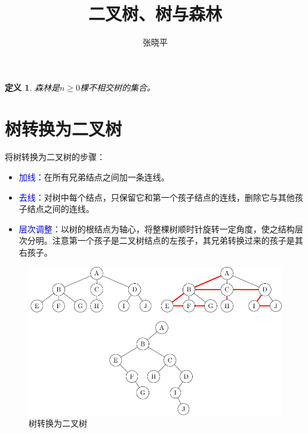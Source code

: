 \documentclass[10pt]{article}
\newcommand{\blue}{\textcolor{blue}}
\begin{document}
\renewcommand{\proofname}{\textbf{证明}}
\newtheorem{li}{例}
\newtheorem{jielun}{结论}
\newtheorem{dingli}{定理}
\newtheorem{mingti}{{命题}} 
\newtheorem{yinli}{{引理}} 
\newtheorem{tuilun}{{推论}}
\newtheorem{dingyi}{{定义}} 
\newtheorem*{jie}{{解}}
\newtheorem*{zhengming}{{证明}}
\newtheorem{zhu}{{注}}
\newtheorem*{zhu*}{{注}}
\newtheorem{xingzhi}{{性质}}
\newtheorem{wenti}{{问题}}

\title{二叉树、树与森林}
\author{张晓平}
\maketitle

\begin{dingyi}
森林是$n\ge0$棵不相交树的集合。
\end{dingyi}
\section{树转换为二叉树}
将树转换为二叉树的步骤：
\begin{itemize}
\item[1.]  \blue{加线：}在所有兄弟结点之间加一条连线。   \item[2.]  \blue{去线：}对树中每个结点，只保留它和第一个孩子结点的连线，删除它与其他孩子结点之间的连线。 
\item[3.]  \blue{层次调整：}以树的根结点为轴心，将整棵树顺时针旋转一定角度，使之结构层次分明。注意第一个孩子是二叉树结点的左孩子，其兄弟转换过来的孩子是其右孩子。
\end{itemize}
\begin{figure}[htbp]
\centering
\includegraphics[width=5in]{TIKZ/forest/tree2btree.pdf}
\caption{树转换为二叉树}
\end{figure}
\end{document}
